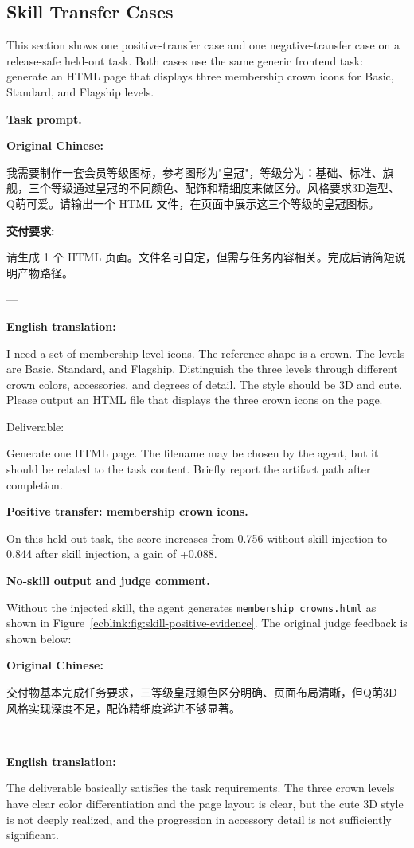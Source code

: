\documentclass{llmxive}
\providecommand{\inlinett}[1]{{\footnotesize\texttt{#1}}}
\providecommand{\caseheader}[1]{\noindent\colorbox{fbcaseblue}{\parbox{0.96\linewidth}{\bfseries #1}}\vspace{0.5mm}\newline}
\begin{document}
\subsection{Skill Transfer Cases}
This section shows one positive-transfer case and one negative-transfer case on a release-safe held-out task. Both cases use the same generic frontend task: generate an HTML page that displays three membership crown icons for Basic, Standard, and Flagship levels. 

\caseheader{Task prompt.}
\begin{casebox}\scriptsize
\textbf{Original Chinese:}

我需要制作一套会员等级图标，参考图形为"皇冠"，等级分为：基础、标准、旗舰，三个等级通过皇冠的不同颜色、配饰和精细度来做区分。风格要求3D造型、Q萌可爱。请输出一个 HTML 文件，在页面中展示这三个等级的皇冠图标。

\textbf{交付要求:}

请生成 1 个 HTML 页面。文件名可自定，但需与任务内容相关。完成后请简短说明产物路径。

---

\textbf{English translation:}

I need a set of membership-level icons. The reference shape is a crown. The levels are Basic, Standard, and Flagship. Distinguish the three levels through different crown colors, accessories, and degrees of detail. The style should be 3D and cute. Please output an HTML file that displays the three crown icons on the page.

Deliverable:

Generate one HTML page. The filename may be chosen by the agent, but it should be related to the task content. Briefly report the artifact path after completion.
\end{casebox}

\caseheader{Positive transfer: membership crown icons.}
On this held-out task, the score increases from 0.756 without skill injection to 0.844 after skill injection, a gain of +0.088.

\caseheader{No-skill output and judge comment.}
Without the injected skill, the agent generates \inlinett{membership\_crowns.html} as shown in Figure~\ref{ecblink:fig:skill-positive-evidence}. The original judge feedback is shown below:
\begin{casebox}\scriptsize
\textbf{Original Chinese:}

交付物基本完成任务要求，三等级皇冠颜色区分明确、页面布局清晰，但Q萌3D风格实现深度不足，配饰精细度递进不够显著。

---

\textbf{English translation:}

The deliverable basically satisfies the task requirements. The three crown levels have clear color differentiation and the page layout is clear, but the cute 3D style is not deeply realized, and the progression in accessory detail is not sufficiently significant.
\end{casebox}
\end{document}

